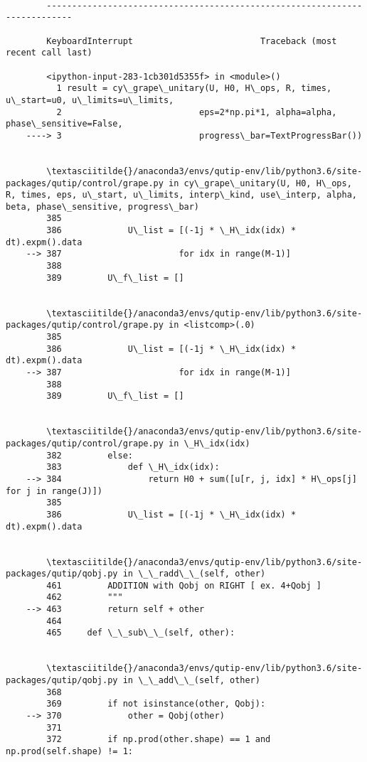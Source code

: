 \documentclass[11pt]{article}
\begin{document}
    \begin{Verbatim}[commandchars=\\\{\}]

        ---------------------------------------------------------------------------

        KeyboardInterrupt                         Traceback (most recent call last)

        <ipython-input-283-1cb301d5355f> in <module>()
          1 result = cy\_grape\_unitary(U, H0, H\_ops, R, times, u\_start=u0, u\_limits=u\_limits,
          2                           eps=2*np.pi*1, alpha=alpha, phase\_sensitive=False,
    ----> 3                           progress\_bar=TextProgressBar())
    

        \textasciitilde{}/anaconda3/envs/qutip-env/lib/python3.6/site-packages/qutip/control/grape.py in cy\_grape\_unitary(U, H0, H\_ops, R, times, eps, u\_start, u\_limits, interp\_kind, use\_interp, alpha, beta, phase\_sensitive, progress\_bar)
        385 
        386             U\_list = [(-1j * \_H\_idx(idx) * dt).expm().data
    --> 387                       for idx in range(M-1)]
        388 
        389         U\_f\_list = []


        \textasciitilde{}/anaconda3/envs/qutip-env/lib/python3.6/site-packages/qutip/control/grape.py in <listcomp>(.0)
        385 
        386             U\_list = [(-1j * \_H\_idx(idx) * dt).expm().data
    --> 387                       for idx in range(M-1)]
        388 
        389         U\_f\_list = []


        \textasciitilde{}/anaconda3/envs/qutip-env/lib/python3.6/site-packages/qutip/control/grape.py in \_H\_idx(idx)
        382         else:
        383             def \_H\_idx(idx):
    --> 384                 return H0 + sum([u[r, j, idx] * H\_ops[j] for j in range(J)])
        385 
        386             U\_list = [(-1j * \_H\_idx(idx) * dt).expm().data


        \textasciitilde{}/anaconda3/envs/qutip-env/lib/python3.6/site-packages/qutip/qobj.py in \_\_radd\_\_(self, other)
        461         ADDITION with Qobj on RIGHT [ ex. 4+Qobj ]
        462         """
    --> 463         return self + other
        464 
        465     def \_\_sub\_\_(self, other):


        \textasciitilde{}/anaconda3/envs/qutip-env/lib/python3.6/site-packages/qutip/qobj.py in \_\_add\_\_(self, other)
        368 
        369         if not isinstance(other, Qobj):
    --> 370             other = Qobj(other)
        371 
        372         if np.prod(other.shape) == 1 and np.prod(self.shape) != 1:



\end{Verbatim}
\end{document}
